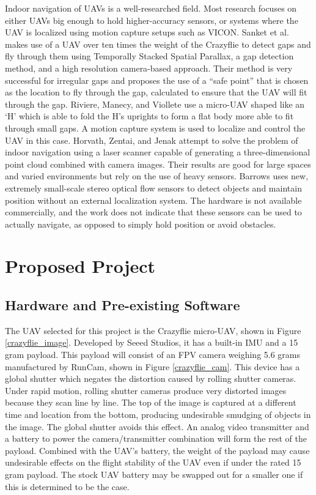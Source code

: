 \documentclass[12pt]{article}
\begin{document}
Indoor navigation of UAVs is a well-researched field. Most research focuses on either UAVs big enough to hold higher-accuracy sensors, or systems where the UAV is localized using motion capture setups such as VICON. Sanket et al. \cite{gapflyt} makes use of a UAV over ten times the weight of the Crazyflie to detect gaps and fly through them using Temporally Stacked Spatial Parallax, a gap detection method, and a high resolution camera-based approach. Their method is very successful for irregular gaps and proposes the use of a ``safe point'' that is chosen as the location to fly through the gap, calculated to ensure that the UAV will fit through the gap. Riviere, Manecy, and Viollete\cite{Folding} use a micro-UAV shaped like an `H' which is able to fold the H's uprights to form a flat body more able to fit through small gaps. A motion capture system is used to localize and control the UAV in this case. Horvath, Zentai, and Jenak\cite{PCNav} attempt to solve the problem of indoor navigation using a laser scanner capable of generating a three-dimensional point cloud combined with camera images. Their results are good for large spaces and varied environments but rely on the use of heavy sensors. Barrows\cite{crazyflie_centeye} uses new, extremely small-scale stereo optical flow sensors to detect objects and maintain position without an external localization system. The hardware is not available commercially, and the work does not indicate that these sensors can be used to actually navigate, as opposed to simply hold position or avoid obstacles. 

\section{Proposed Project}
\subsection{Hardware and Pre-existing Software}
The UAV selected for this project is the Crazyflie micro-UAV, shown in Figure \ref{crazyflie_image}. Developed by Seeed Studios, it has a built-in IMU and a 15 gram payload. This payload will consist of an FPV camera weighing 5.6 grams manufactured by RunCam, shown in Figure \ref{crazyflie_cam}. This device has a global shutter which negates the distortion caused by rolling shutter cameras. Under rapid motion, rolling shutter cameras produce very distorted images because they scan line by line. The top of the image is captured at a different time and location from the bottom, producing undesirable smudging of objects in the image. The global shutter avoids this effect. An analog video transmitter and a battery to power the camera/transmitter combination will form the rest of the payload. Combined with the UAV's battery, the weight of the payload may cause undesirable effects on the flight stability of the UAV even if under the rated 15 gram payload. The stock UAV battery may be swapped out for a smaller one if this is determined to be the case.
\end{document}
